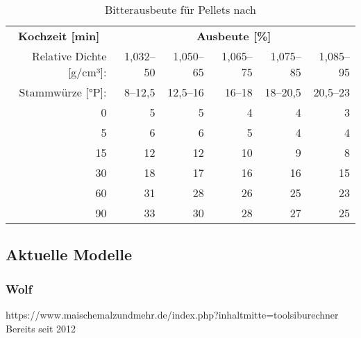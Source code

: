 \documentclass[a4paper,parskip=half]{scrartcl}
\begin{document}
\begin{table}[H]
\centering
\begin{tabular}{rrrrrr} 
\toprule
\multicolumn{1}{c}{\textbf{Kochzeit [min]}} & \multicolumn{5}{c}{\textbf{Ausbeute [\%]}}                                 \\
Relative Dichte [g/cm³]:                    & 1,032–50 & 1,050–65 & 1,065–75 & 1,075–85 & 1,085–95  \\
Stammwürze [°P]:                    & 8–12,5 & 12,5–16 & 16–18 & 18–20,5 & 20,5–23  \\
\midrule
0                                            & 5        & 5        & 4                            & 4                            & 3                             \\
5                                            & 6        & 6        & 5                            & 4                            & 4                             \\
15                                           & 12       & 12       & 10                           & 9                            & 8                             \\
30                                           & 18       & 17       & 16                           & 16                           & 15                            \\
60                                           & 31       & 28       & 26                           & 25                           & 23                            \\
90                                           & 33       & 30       & 28                           & 27                           & 25                     \\
\bottomrule
\end{tabular}
\caption{Bitterausbeute für Pellets nach \citeauthor{Noonan1996} \parencite[215]{Noonan1996}}
\label{table:noonanutilpellets}
\end{table}

\subsection*{Aktuelle Modelle}

\subsubsection*{Wolf}

https://www.maischemalzundmehr.de/index.php?inhaltmitte=toolsiburechner
Bereits seit 2012
\end{document}

